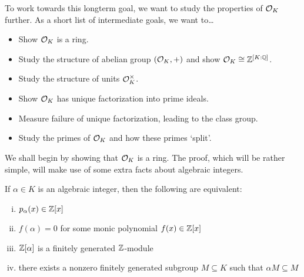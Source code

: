 To work towards this longterm goal, we want to study the properties of $\mathcal{O}_K$ further. As a short list of intermediate goals, we want to\dots
	\begin{itemize}
	\item Show $\mathcal{O}_K$ is a ring.
	\item Study the structure of abelian group $(\mathcal{O}_K, +)$ and show $\mathcal{O}_K \cong \mathbb{Z}^{[K:\mathbb{Q}]}$.
	\item Study the structure of units $\mathcal{O}_K^\times$.
	\item Show $\mathcal{O}_K$ has unique factorization into prime ideals.
	\item Measure failure of unique factorization, leading to the class group.
	\item Study the primes of $\mathcal{O}_K$ and how these primes `split'. 
	\end{itemize}


We shall begin by showing that $\mathcal{O}_K$ is a ring. The proof, which will be rather simple, will make use of some extra facts about algebraic integers.


\begin{prop}\label{prop:algint}
If $\alpha \in K$ is an algebraic integer, then the following are equivalent:
	\begin{enumerate}[(i)]
	\item $p_\alpha(x) \in \mathbb{Z}[x]$
	\item $f(\alpha)= 0$ for some monic polynomial $f(x) \in \mathbb{Z}[x]$
	\item $\mathbb{Z}[\alpha]$ is a finitely generated $\mathbb{Z}$-module
	\item there exists a nonzero finitely generated subgroup $M \subseteq K$ such that $\alpha M  \subseteq M$
	\end{enumerate}
\end{prop}

